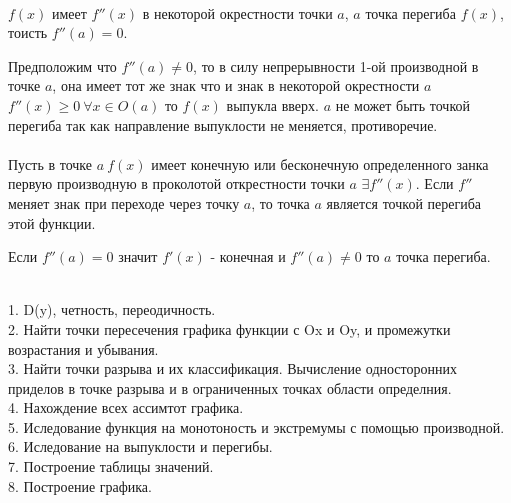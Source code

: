 \\
$f(x)$ имеет $f''(x)$ в некоторой окрестности точки $a$, $a$ точка перегиба
$f(x)$, тоисть $f''(a) = 0$.

 Предположим что $f''(a)\not= 0$, то в силу непрерывности
1-ой производной в точке $a$, она имеет тот же знак что и знак в некоторой
окрестности $a$ $f''(x)\ge 0 ~ \forall x\in O(a)$ то $f(x)$ выпукла вверх.
$a$ не может быть точкой перегиба так как направление выпуклости не меняется,
противоречие.\\

\\
Пусть в точке $a ~ f(x)$ имеет конечную или бесконечную определенного занка
первую производную в проколотой открестности точки $a$ $\exists f''(x)$.
Если $f''$ меняет знак при переходе через точку $a$, то точка $a$ является
точкой перегиба этой функции.\\

\begin{theorem}
  Если $f''(a) = 0$ значит $f'(x)$ - конечная и $f''(a) \not= 0$ то
  $a$ точка перегиба.\\
\end{theorem}

\\
1. D(y), четность, переодичность.\\
2. Найти точки пересечения графика функции с Ox и Oy, и
промежутки возрастания и убывания.\\
3. Найти точки разрыва и их классификация. Вычисление
односторонних приделов в точке разрыва и в ограниченных
точках области определния.\\
4. Нахождение всех ассимтот графика.\\
5. Иследование функция на монотоность и экстремумы с
помощью производной.\\
6. Иследование на выпуклости и перегибы.\\
7. Построение таблицы значений.\\
8. Построение графика.\\